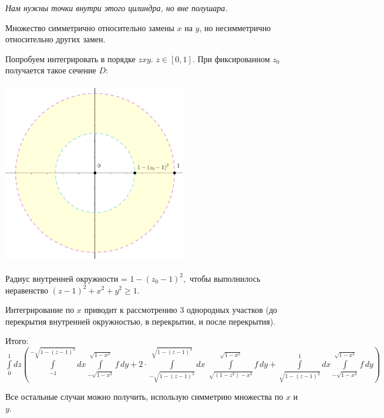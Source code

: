 \documentclass[a4paper, fleqn]{article}
\begin{document}
    \textit{Нам нужны точки внутри этого цилиндра, но вне полушара.}
    
    Множество симметрично относительно замены $x$ на $y$, но несимметрично относительно других замен.
    
    Попробуем интегрировать в порядке $zxy$. $z \in [0, 1].$  При фиксированном $z_0$ получается такое сечение $D$:
    
    \includegraphics[width=8cm, height=8cm]{task 21-2.png}
    
    Радиус внутренней окружности = $1 - (z_0 - 1)^2,$ чтобы выполнилось неравенство  $(z - 1)^2 + x^2 + y^2 \geq 1.$ 
    
    Интегрирование по $x$ приводит к рассмотрению 3 однородных участков (до перекрытия внутренней окружностью, в перекрытии, и после перекрытия).
    
    Итого: $\int\limits_{0}^{1} dz \left(
    \int\limits_{-1}^{-\sqrt{1 - (z - 1)^2}} dx \int\limits_{-\sqrt{1 - x^2}}^{\sqrt{1 - x^2}} f \, dy +
    2 \cdot \int\limits_{-\sqrt{1 - (z - 1)^2}}^{\sqrt{1 - (z - 1)^2}} dx \;  \int\limits_{\sqrt{(1 - z^2) - x^2}}^{\sqrt{1 - x^2}} f \, dy + 
    \int\limits_{\sqrt{1 - (z - 1)^2}}^{1}dx \int\limits_{-\sqrt{1 - x^2}}^{\sqrt{1 - x^2}} f \, dy
    \right)$
    
    Все остальные случаи можно получить, использую симметрию множества по $x$ и $y$.
    
    
\end{document}
